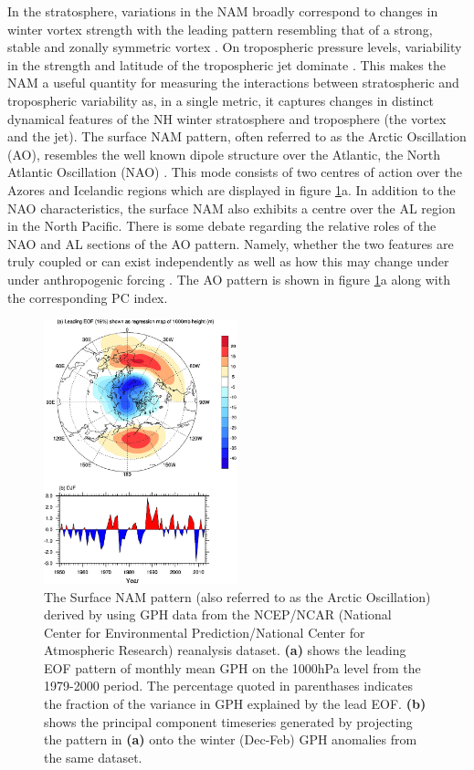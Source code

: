 In the stratosphere, variations in the NAM broadly correspond to changes in winter vortex strength with the leading pattern resembling that of a strong, stable and zonally symmetric vortex \citep{baldwinPropagation1999}. On tropospheric pressure levels, variability in the strength and latitude of the tropospheric jet dominate \citep{limpasuvanEddies1999}. This makes the NAM a useful quantity for measuring the interactions between stratospheric and tropospheric variability as, in a single metric, it captures changes in distinct dynamical features of the NH winter stratosphere and troposphere (the vortex and the jet). The surface NAM pattern, often referred to as the Arctic Oscillation (AO), resembles the well known dipole structure over the Atlantic, the North Atlantic Oscillation (NAO) \citep{hurrellNorth2003c}. This mode consists of two centres of action over the Azores and Icelandic regions which are displayed in figure \ref{fig:AO}a. In addition to the NAO characteristics, the surface NAM also exhibits a centre over the AL region in the North Pacific. There is some debate regarding the relative roles of the NAO and AL sections of the AO pattern. Namely, whether the two features are truly coupled or can exist independently \citep{deserTeleconnectivity2000, ambaumArctic2001} as well as how this may change under under anthropogenic forcing \citep{hamoudaDecoupling2021}. The AO pattern is shown in figure \ref{fig:AO}a along with the corresponding PC index.

\begin{figure}[h!]
\centering
    \includegraphics[width=0.5\textwidth]{Figures/Figures-background/AO_pattern.jpg}
    \caption{The Surface NAM pattern (also referred to as the Arctic Oscillation) derived by \cite{hegyiDynamical2011b} using GPH data from the NCEP/NCAR (National Center for Environmental Prediction/National Center for Atmospheric Research) reanalysis dataset. \textbf{(a)} shows the leading EOF pattern of monthly mean GPH on the 1000hPa level from the 1979-2000 period. The percentage quoted in parenthases indicates the fraction of the variance in GPH explained by the lead EOF. \textbf{(b)} shows the principal component timeseries generated by projecting the pattern in \textbf{(a)} onto the winter (Dec-Feb) GPH anomalies from the same dataset.}
\centering
\label{fig:AO}
\end{figure}


